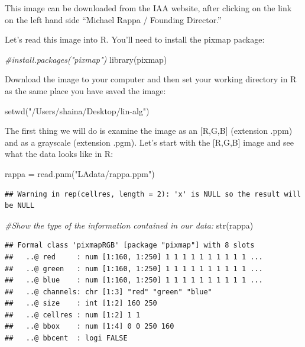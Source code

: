 \documentclass[
]{article}
\newenvironment{Shaded}{\begin{snugshade}}{\end{snugshade}}
\newcommand{\CommentTok}[1]{\textcolor[rgb]{0.56,0.35,0.01}{\textit{#1}}}
\newcommand{\FunctionTok}[1]{\textcolor[rgb]{0.00,0.00,0.00}{#1}}
\newcommand{\NormalTok}[1]{#1}
\newcommand{\OtherTok}[1]{\textcolor[rgb]{0.56,0.35,0.01}{#1}}
\newcommand{\StringTok}[1]{\textcolor[rgb]{0.31,0.60,0.02}{#1}}
\theoremstyle{definition}
\theoremstyle{definition}
\theoremstyle{definition}
\theoremstyle{definition}
\theoremstyle{remark}
\begin{document}
This image can be downloaded from the IAA website, after clicking on the link on the left hand side ``Michael Rappa / Founding Director.''

Let's read this image into R. You'll need to install the pixmap package:

\begin{Shaded}
\begin{Highlighting}[]
\CommentTok{\#install.packages("pixmap")}
\FunctionTok{library}\NormalTok{(pixmap)}
\end{Highlighting}
\end{Shaded}

Download the image to your computer and then set your working directory in R as the same place you have saved the image:

\begin{Shaded}
\begin{Highlighting}[]
\FunctionTok{setwd}\NormalTok{(}\StringTok{"/Users/shaina/Desktop/lin{-}alg"}\NormalTok{)}
\end{Highlighting}
\end{Shaded}

The first thing we will do is examine the image as an {[}R,G,B{]} (extension .ppm) and as a grayscale (extension .pgm). Let's start with the {[}R,G,B{]} image and see what the data looks like in R:

\begin{Shaded}
\begin{Highlighting}[]
\NormalTok{rappa }\OtherTok{=} \FunctionTok{read.pnm}\NormalTok{(}\StringTok{"LAdata/rappa.ppm"}\NormalTok{)}
\end{Highlighting}
\end{Shaded}

\begin{verbatim}
## Warning in rep(cellres, length = 2): 'x' is NULL so the result will be NULL
\end{verbatim}

\begin{Shaded}
\begin{Highlighting}[]
\CommentTok{\#Show the type of the information contained in our data:}
\FunctionTok{str}\NormalTok{(rappa)}
\end{Highlighting}
\end{Shaded}

\begin{verbatim}
## Formal class 'pixmapRGB' [package "pixmap"] with 8 slots
##   ..@ red     : num [1:160, 1:250] 1 1 1 1 1 1 1 1 1 1 ...
##   ..@ green   : num [1:160, 1:250] 1 1 1 1 1 1 1 1 1 1 ...
##   ..@ blue    : num [1:160, 1:250] 1 1 1 1 1 1 1 1 1 1 ...
##   ..@ channels: chr [1:3] "red" "green" "blue"
##   ..@ size    : int [1:2] 160 250
##   ..@ cellres : num [1:2] 1 1
##   ..@ bbox    : num [1:4] 0 0 250 160
##   ..@ bbcent  : logi FALSE
\end{verbatim}
\end{document}
